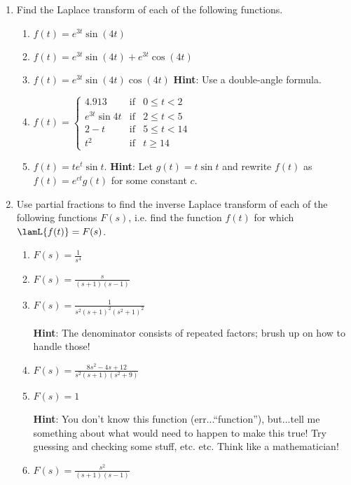 \documentclass[12pt]{article}
\newcommand{\hint}[1]{\quad\textbf{Hint}: #1}
\begin{document}
	\begin{enumerate}
		\item Find the Laplace transform of each of the following functions.
		\begin{enumerate}
			\item $f(t)=e^{3t}\sin(4t)$
			\item $f(t)=e^{3t}\sin(4t)+e^{3t}\cos(4t)$
			\item $f(t)=e^{3t}\sin(4t)\cos(4t)$ \hint{Use a double-angle formula.}
			\item $f(t)=\left\{\begin{array}{rcl}4.913 & \text{if} & 0\leq t<2\\ e^{3t}\sin{4t} & \text{if} & 2\leq t<5\\ 2-t & \text{if} & 5\leq t<14\\ t^2 & \text{if} & t\geq 14 \end{array}\right.$
			\item $f(t)=te^t\sin{t}$. \hint{Let $g(t)=t\sin{t}$ and rewrite $f(t)$ as $f(t)=e^{ct}g(t)$ for some constant $c$.}
		\end{enumerate}
		
		\newpage
		
		\item Use partial fractions to find the inverse Laplace transform of each of the following functions $F(s)$, i.e. find the function $f(t)$ for which $\lamL\{f(t)\}=F(s)$.
		\begin{enumerate}
			\item $F(s)=\frac{1}{s^4}$
			\item $F(s)=\frac{s}{(s+1)(s-1)}$
			\item $F(s)=\frac{1}{s^2(s+1)^2(s^2+1)^2}$ \vspace{3mm}
			
			\hint{The denominator consists of repeated factors; brush up on how to handle those!}
			\item $F(s)=\frac{8s^2-4s+12}{s^2(s+1)(s^2+9)}$
			\item $F(s)=1$ \vspace{3mm}
			
			\hint{You don't know this function (err...``function''), but...tell me something about what would need to happen to make this true! Try guessing and checking some stuff, etc. etc. Think like a mathematician!}
			
			\item $F(s)=\frac{s^2}{(s+1)(s-1)}$\vspace{3mm}
			

\end{enumerate}
\end{enumerate}
\end{document}
